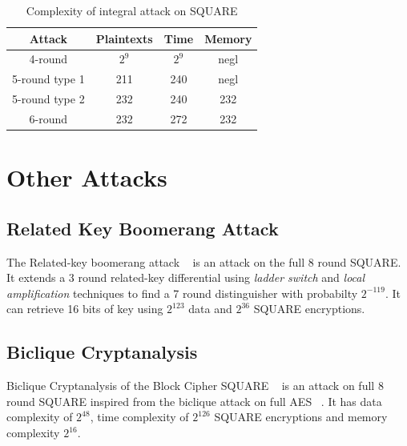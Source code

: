 \documentclass[preprint]{transcrypto}
\begin{document}
\begin{table}
  \centering
  \begin{tabular}{|c|c|c|c|}
    \hline
    Attack          & Plaintexts & Time  & Memory \\
    \hline
    4-round         & $2^9$      & $2^9$ & negl   \\
    5-round  type 1 & 211        & 240   & negl   \\
    5-round  type 2 & 232        & 240   & 232    \\
    6-round         & 232        & 272   & 232    \\
    \hline
  \end{tabular}

  \caption{Complexity of integral attack on SQUARE}
  \label{tab:complexity}
\end{table}

\section{Other Attacks}
\subsection{Related Key Boomerang Attack}
The Related-key boomerang attack ~\cite{EPRINT:KooYeoSon10} is an attack on the full 8 round SQUARE. It extends a 3 round related-key differential using \textit{ladder switch} and \textit{local amplification} techniques to find a 7 round distinguisher with probabilty $2^{-119}$. It can retrieve 16 bits of key using $2^{123}$ data and $2^{36}$ SQUARE encryptions.

\subsection{Biclique Cryptanalysis}
Biclique Cryptanalysis of the Block Cipher SQUARE ~\cite{EPRINT:Mala11} is an attack on full 8 round SQUARE inspired from the biclique attack on full AES ~\cite{AC:BogKhoRec11}. It has data complexity of $2^{48}$, time complexity of $2^{126}$ SQUARE encryptions and memory complexity $2^{16}$.



\end{document}
